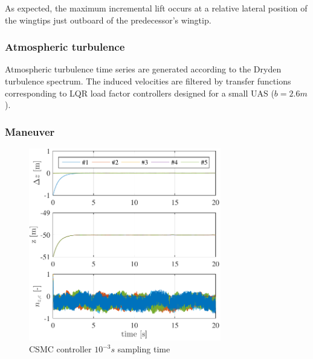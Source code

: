 \documentclass{ifacconf}
\begin{document}
As expected, the maximum incremental lift occurs at a relative lateral position of the wingtips just outboard of the predecessor's wingtip.

\subsubsection{Atmospheric turbulence}
Atmospheric turbulence time series are generated according to the Dryden turbulence spectrum. The induced velocities are filtered by transfer functions corresponding to LQR load factor controllers designed for a small UAS ($b=2.6m$).

\subsubsection{Maneuver}



\begin{figure}
\begin{center}
\includegraphics[width=8.4cm]{STSMC-1000Hz-TIMESCALESEPARATION-turbulence=1}    %
\caption{CSMC controller $10^{-3} s$ sampling time}
\label{fig:CSMC1000Hz}
\end{center}
\end{figure}
\end{document}
